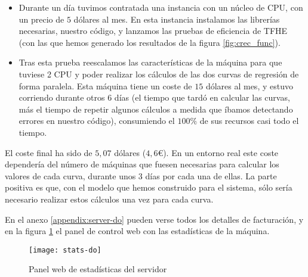 \begin{itemize}
    \item Durante un día tuvimos contratada una instancia con un núcleo de CPU, con un precio de $5$ dólares al mes.
    En esta instancia instalamos las librerías necesarias, nuestro código, y lanzamos las pruebas de eficiencia de TFHE (con las que hemos generado los resultados de la figura \ref{fig:crec_func}).
    \item Tras esta prueba reescalamos las características de la máquina para que tuviese 2 CPU y poder realizar los cálculos de las dos curvas de regresión de forma paralela. Esta máquina tiene un coste de $15$ dólares al mes, y estuvo corriendo durante otros 6 días (el tiempo que tardó en calcular las curvas, más el tiempo de repetir algunos cálculos a medida que íbamos detectando errores en nuestro código), consumiendo el $100\%$ de sus recursos casi todo el tiempo.
\end{itemize}

El coste final ha sido de $5,07$ dólares ($4,6$\euro). En un entorno real este coste dependería del número de máquinas que fuesen necesarias para calcular los valores de cada curva, durante unos 3 días por cada una de ellas. La parte positiva es que, con el modelo que hemos construido para el sistema, sólo sería necesario realizar estos cálculos una vez para cada curva.

En el anexo \ref{appendix:server-do} pueden verse todos los detalles de facturación, y en la figura \ref{fig:stats-do} el panel de control web con las estadísticas de la máquina.

\begin{figure}[h]
    \texttt{[image: stats-do]}
    \caption{Panel web de estadísticas del servidor}
    \label{fig:stats-do}
\end{figure}
